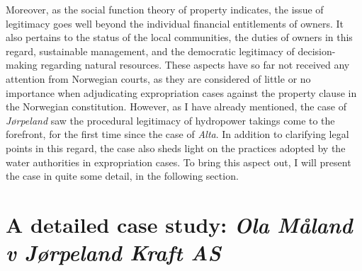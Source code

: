 Moreover, as the social function theory of property indicates, the issue of legitimacy goes well beyond the individual financial entitlements of owners. It also pertains to the status of the local communities, the duties of owners in this regard, sustainable management, and the democratic legitimacy of decision-making regarding natural resources. These aspects have so far not received any attention from Norwegian courts, as they are considered of little or no importance when adjudicating expropriation cases against the property clause in the Norwegian constitution. However, as I have already mentioned, the case of {\it Jørpeland} saw the procedural legitimacy of hydropower takings come to the forefront, for the first time since the case of {\it Alta}. In addition to clarifying legal points in this regard, the case also sheds light on the practices adopted by the water authorities in expropriation cases. To bring this aspect out, I will present the case in quite some detail, in the following section.


\section{A detailed case study: {\it Ola Måland v Jørpeland Kraft AS}}\label{sec:jorpeland}


